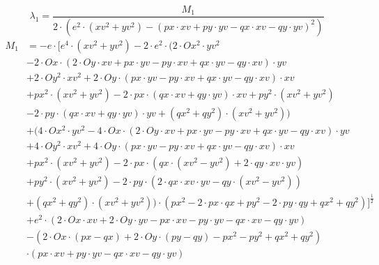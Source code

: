 \documentclass[reducespace,stylepage,semiarbeit]{spezidoc}
\begin{document}
\begin{equation*}
\lambda_1 = \dfrac{M_1}{2 \cdot (e^{2} \cdot (xv^{2} + yv^{2}) - (px \cdot xv + py \cdot yv - qx \cdot xv - qy \cdot yv)^{2})}
\end{equation*}
\begin{equation*}
\begin{aligned}
M_1 &= −e \cdot [e^{4} \cdot (xv^{2} + yv^{2}) - 2 \cdot e^{2} \cdot (2 \cdot Ox^{2} \cdot yv^{2} \\
&- 2 \cdot Ox \cdot (2 \cdot Oy \cdot xv + px \cdot yv - py \cdot xv + qx \cdot yv - qy \cdot xv) \cdot yv \\
&+ 2 \cdot Oy^{2} \cdot xv^{2} + 2 \cdot Oy \cdot (px \cdot yv - py \cdot xv + qx \cdot yv - qy \cdot xv) \cdot xv \\
&+ px^{2} \cdot (xv^{2} + yv^{2}) - 2 \cdot px \cdot (qx \cdot xv + qy \cdot yv) \cdot xv + py^{2} \cdot (xv^{2} + yv^{2}) \\
&- 2 \cdot py \cdot (qx \cdot xv + qy \cdot yv) \cdot yv + (qx^{2} + qy^{2}) \cdot (xv^{2} + yv^{2})) \\
&+ (4 \cdot Ox^{2} \cdot yv^{2} - 4 \cdot Ox \cdot (2 \cdot Oy \cdot xv + px \cdot yv - py \cdot xv + qx \cdot yv - qy \cdot xv) \cdot yv \\
&+ 4 \cdot Oy^{2} \cdot xv^{2} + 4 \cdot Oy \cdot (px \cdot yv - py \cdot xv + qx \cdot yv - qy \cdot xv) \cdot xv \\
&+ px^{2} \cdot (xv^{2} + yv^{2}) - 2 \cdot px \cdot (qx \cdot (xv^{2} - yv^{2}) + 2 \cdot qy \cdot xv \cdot yv) \\
&+ py^{2} \cdot (xv^{2} + yv^{2}) - 2 \cdot py \cdot (2 \cdot qx \cdot xv \cdot yv - qy \cdot (xv^{2} - yv^{2})) \\
&+ (qx^{2} + qy^{2}) \cdot (xv^{2} + yv^{2})) \cdot (px^{2} - 2 \cdot px \cdot qx + py^{2} - 2 \cdot py \cdot qy + qx^{2} + qy^{2})]^{\frac{1}{2}} \\
&+ e^{2} \cdot (2 \cdot Ox \cdot xv + 2 \cdot Oy \cdot yv - px \cdot xv - py \cdot yv - qx \cdot xv - qy \cdot yv) \\
&- (2 \cdot Ox \cdot (px - qx) + 2 \cdot Oy \cdot (py - qy) - px^{2} - py^{2} + qx^{2} + qy^{2}) \\
&\cdot (px \cdot xv + py \cdot yv - qx \cdot xv - qy \cdot yv)
\end{aligned}
\end{equation*}





\begin{equation*}
\begin{split}
\end{split}
\end{equation*}
\end{document}
